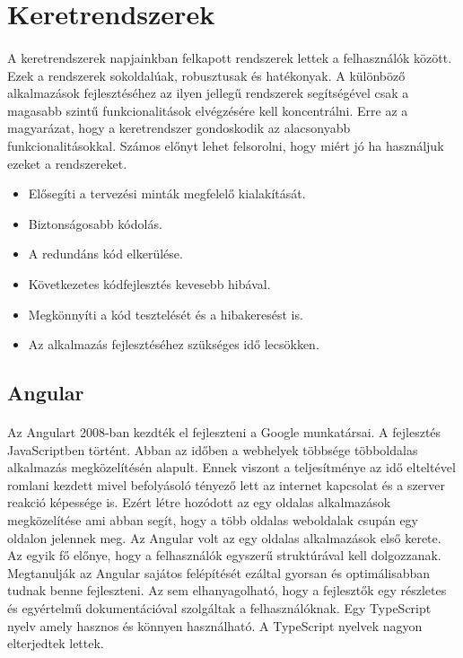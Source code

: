 \section{Keretrendszerek}
	\paragraph{}
	A keretrendszerek napjainkban felkapott rendszerek lettek a felhasználók között. Ezek a rendszerek sokoldalúak, robusztusak és hatékonyak. A különböző alkalmazások fejlesztéséhez az ilyen jellegű rendszerek segítségével csak a magasabb szintű funkcionalitások elvégzésére kell koncentrálni. Erre az a magyarázat, hogy a keretrendszer gondoskodik az alacsonyabb funkcionalitásokkal. Számos előnyt lehet felsorolni, hogy miért jó ha használjuk ezeket a rendszereket.\cite{frameworks}
	\begin{itemize}
		\item Elősegíti a tervezési minták megfelelő kialakítását.
		\item Biztonságosabb kódolás.
		\item A redundáns kód elkerülése.
		\item Következetes kódfejlesztés kevesebb hibával.
		\item Megkönnyíti a kód tesztelését és a hibakeresést is.
		\item Az alkalmazás fejlesztéséhez szükséges idő lecsökken.
	\end{itemize}

	\subsection{Angular}
	\paragraph{}
	Az Angulart 2008-ban kezdték el fejleszteni a Google munkatársai. A fejlesztés JavaScriptben történt. Abban az időben a webhelyek többsége többoldalas alkalmazás megközelítésén alapult. Ennek viszont a teljesítménye az idő elteltével romlani kezdett mivel befolyásoló tényező lett az internet kapcsolat és a szerver reakció képessége is. Ezért létre hozódott az egy oldalas alkalmazások megközelítése ami abban segít, hogy a több oldalas weboldalak csupán egy oldalon jelennek meg. Az Angular volt az egy oldalas alkalmazások első kerete. Az egyik fő előnye, hogy a felhasználók egyszerű struktúrával kell dolgozzanak. Megtanulják az Angular sajátos felépítését ezáltal gyorsan és optimálisabban tudnak benne fejleszteni. Az sem elhanyagolható, hogy a fejlesztők egy részletes és egyértelmű dokumentációval szolgáltak a felhasználóknak. Egy TypeScript nyelv amely hasznos és könnyen használható. A TypeScript nyelvek nagyon elterjedtek lettek. \cite{wohlgethan2018supportingweb}
	

